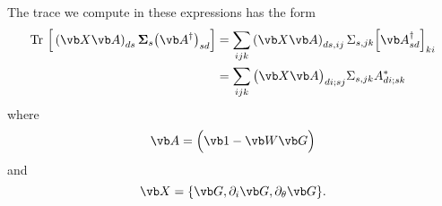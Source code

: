 \documentclass[letterpaper]{article}
\newcommand{\vbSigma}{\boldsymbol{\Sigma}}
\begin{document}
The trace we compute in these expressions has the form
\begin{align*}
\text{Tr }\Big[ \left(\vb X \vb A\right)_{ds}
                \vbSigma_s
                \big(\vb A^\dagger\big)_{sd} 
          \Big]
&= \sum_{ijk} \left(\vb X \vb A\right)_{ds, ij}
              \Sigma_{s,jk}
              \Big[\vb A^\dagger_{sd}\Big]_{ki}
\\
&= \sum_{ijk} \big(\vb X \vb A\big)_{di; sj}
              \Sigma_{s,jk}
              A^*_{di;sk}
\end{align*}
where 
$$\vb A = \Big( \vb 1 - \vb W \vb G\Big)$$
and
$$ \vb X=\{\vb G, \partial_i \vb G, \partial_\theta \vb G\}.$$
\end{document}
